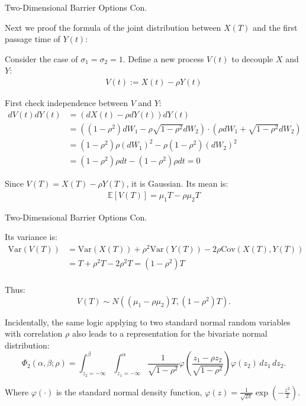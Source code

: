 \documentclass{beamer}
\begin{document}
\begin{frame}{Two-Dimensional Barrier Options Con.}

    {\footnotesize \footnotesize
    Next we proof the formula of the joint distribution between \( X(T) \) 
    and the first passage time of \( Y(t) \):
    \par [Proof]
    \par Consider the case of $\sigma_1 = \sigma_2 = 1$. Define a new process $V(t)$ to decouple $X$ and $Y$:
    \begin{align*}
        V(t) := X(t) - \rho Y(t)
    \end{align*}
    \par First check independence between $V$ and $Y$:
    \begin{align*}
        dV(t)  dY(t)  & = (dX(t) - \rho  dY(t))  dY(t)\\
        &= \left( (1 - \rho^2) dW_1 - \rho \sqrt{1 - \rho^2}  
        dW_2 \right) \cdot \left( \rho dW_1 + \sqrt{1 - \rho^2}  dW_2 \right)\\
        &=(1 - \rho^2) \rho (dW_1)^2 - \rho (1 - \rho^2) (dW_2)^2\\
        &= (1 - \rho^2) \rho dt - (1 - \rho^2) \rho dt = 0
    \end{align*}
    \par  Since \( V(T) = X(T) - \rho Y(T) \), it is Gaussian. Its mean is:
    \begin{align*}
        \mathbb{E}[V(T)] = \mu_1 T - \rho \mu_2 T
    \end{align*}
    }
\end{frame}
\begin{frame}{Two-Dimensional Barrier Options Con.}

    {\footnotesize \footnotesize
    \par Its variance is:
    \begin{align*}
        \text{Var}(V(T)) 
        &= \text{Var}(X(T)) + \rho^2 \text{Var}(Y(T)) - 2\rho \text{Cov}(X(T), Y(T))\\
        &= T + \rho^2 T - 2\rho^2 T = (1 - \rho^2)T\\
    \end{align*}
    \par Thus:
        \[
        V(T) \sim N((\mu_1 - \rho \mu_2)T, (1 - \rho^2)T).
        \]
    \par Incidentally, the same logic applying to two standard normal random variables with correlation \(\rho\) also leads to a representation for the bivariate normal distribution:
    \[
    \Phi_2(\alpha, \beta; \rho) = \int_{z_2=-\infty}^{\beta} \int_{z_1=-\infty}^{\alpha} \frac{1}{\sqrt{1 - \rho^2}} \varphi\left( \frac{z_1 - \rho z_2}{\sqrt{1 - \rho^2}} \right) \varphi(z_2) \, dz_1 \, dz_2.
    \]
    \par Where $\varphi(\cdot)$ is the standard normal density function, $\varphi(z) = \frac{1}{\sqrt{2\pi}}\exp\left(-\frac{z^2}{2}\right).$

    }
    
\end{frame}
\end{document}
